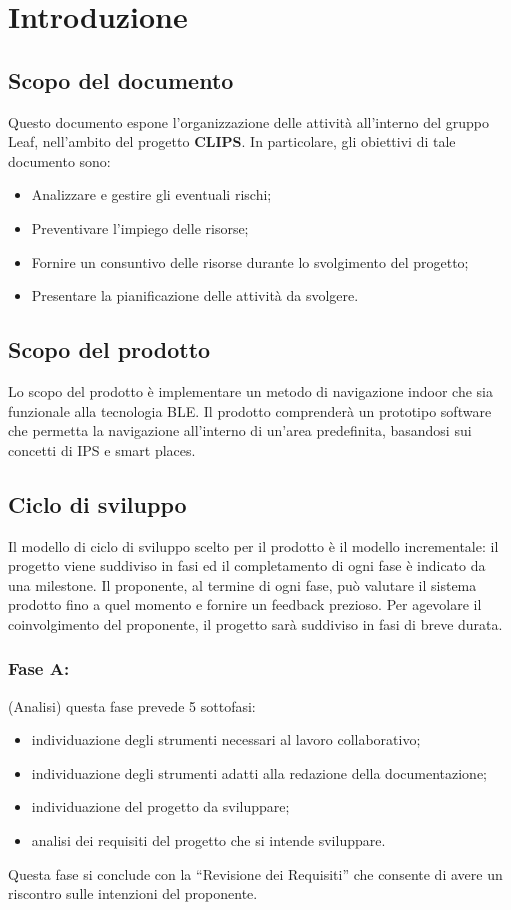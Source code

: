 \documentclass[../PianoProgetto.tex]{subfiles}
\begin{document}
\section{Introduzione}
	\subsection{Scopo del documento}
	Questo documento espone l'organizzazione delle attività all'interno del gruppo Leaf, nell'ambito del progetto \textbf{CLIPS}.
In particolare, gli obiettivi di tale documento sono:
	\begin{itemize}
	\item Analizzare e gestire gli eventuali rischi;
	\item Preventivare l'impiego delle risorse;
	\item Fornire un consuntivo delle risorse durante lo svolgimento del progetto;
	\item Presentare la pianificazione delle attività da svolgere.
	\end{itemize}
	
	\subsection{Scopo del prodotto}
	Lo scopo del prodotto è implementare un metodo di navigazione indoor che sia funzionale alla tecnologia BLE.
	Il prodotto comprenderà un prototipo software che permetta la navigazione all’interno di un’area predefinita, basandosi sui concetti di IPS e smart places.


	\subsection{Ciclo di sviluppo}
	Il modello di ciclo di sviluppo scelto per il prodotto è il modello incrementale: il progetto viene suddiviso in fasi ed il completamento di ogni fase è indicato da una milestone.
	Il proponente, al termine di ogni fase, può valutare il sistema prodotto fino a quel momento e fornire un feedback prezioso.
	Per agevolare il coinvolgimento del proponente, il progetto sarà suddiviso in fasi di breve durata.

		\subsubsection{Fase A:}(Analisi) questa fase prevede 5 sottofasi:
		\begin{itemize}
		\item individuazione degli strumenti necessari al lavoro collaborativo;
		\item individuazione degli strumenti adatti alla redazione della documentazione;
		\item individuazione del progetto da sviluppare;
		\item analisi dei requisiti del progetto che si intende sviluppare.
		\end{itemize}
		Questa fase si conclude con la “Revisione dei Requisiti” che consente di avere un riscontro sulle intenzioni del proponente.
\end{document}
